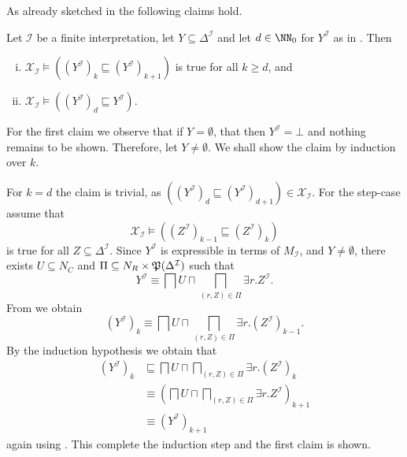 As already sketched in  the following claims hold.

\begin{Lemma}
  \label{lem:X_I-properties}
  Let $\mathcal{I}$ be a finite interpretation, let $Y \subseteq \Delta^{\mathcal{I}}$ and
  let $d \in \NN_0$ for $Y^{\mathcal{I}}$ as in .  Then
  \begin{enumerate}[i. ]
  \item $\mathcal{X}_{\mathcal{I}} \models ((Y^{\mathcal{I}})_k \sqsubseteq
    (Y^{\mathcal{I}})_{k+1})$ is true for all $k \geq d$, and
  \item $\mathcal{X}_{\mathcal{I}} \models ((Y^{\mathcal{I}})_d \sqsubseteq Y^{\mathcal{I}})$.
  \end{enumerate}
\end{Lemma}
\begin{Proof}
  For the first claim we observe that if $Y = \emptyset$, that then $Y^{\mathcal{I}} =
  \bot$ and nothing remains to be shown.  Therefore, let $Y \neq \emptyset$.  We shall
  show the claim by induction over $k$.

  For $k = d$ the claim is trivial, as $((Y^{\mathcal{I}})_d \sqsubseteq
  (Y^{\mathcal{I}})_{d+1}) \in \mathcal{X}_{\mathcal{I}}$.  For the step-case assume that
  \begin{equation}
    \label{eq:34}
    \mathcal{X}_{\mathcal{I}} \models ((Z^{\mathcal{I}})_{k-1} \sqsubseteq (Z^{\mathcal{I}})_k)
  \end{equation}
  is true for all $Z \subseteq \Delta^{\mathcal{I}}$.  Since $Y^{\mathcal{I}}$ is
  expressible in terms of $M_{\mathcal{I}}$, and $Y \neq \emptyset$, there exists $U
  \subseteq N_C$ and $\Pi \subseteq N_R \times {\ensuremath{\mathfrak{P}(\Delta^{\mathcal{I}})}}$ such that
  \begin{equation*}
    Y^{\mathcal{I}} \equiv \bigsqcap U \sqcap \bigsqcap_{(r, Z) \in \Pi} \exists r. Z^{\mathcal{I}}.
  \end{equation*}
  From  we obtain
  \begin{equation*}
    (Y^{\mathcal{I}})_k \equiv \bigsqcap U \sqcap \bigsqcap_{(r, Z) \in \Pi} \exists r.(Z^{\mathcal{I}})_{k-1}.
  \end{equation*}
  By the induction hypothesis  we obtain that
  \begin{align*}
    (Y^{\mathcal{I}})_k
    &\sqsubseteq \bigsqcap U \sqcap \bigsqcap_{(r, Z) \in \Pi} \exists
    r. (Z^{\mathcal{I}})_k\\
    &\equiv (\bigsqcap U \sqcap \bigsqcap_{(r, Z) \in \Pi} \exists
    r. Z^{\mathcal{I}})_{k+1} \\
    &\equiv (Y^{\mathcal{I}})_{k+1}
  \end{align*}
  again using .  This complete the induction step
  and the first claim is shown.


\end{Proof}
